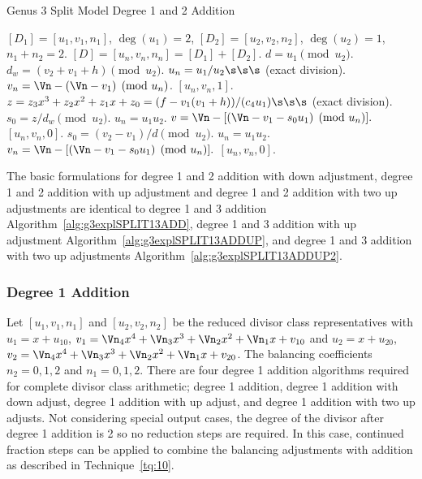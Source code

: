 \begin{algorithm}[H]
\caption{Genus 3 Split Model Degree 1 and 2 Addition\label{alg:g3explSPLIT12ADD}}
\begin{algorithmic} [1]
\Require $[D_1] = [u_1,v_1,n_1]$, $\deg(u_1) = 2$, $[D_2] = [u_2,v_2,n_2]$, $\deg(u_2) = 1$, $n_1 + n_2 = 2$.
\Ensure $[D] = [u_n,v_n,n_n] = [D_1] + [D_2] $.
\algrule
\vspace{-2pt}
\State $d = u_1 \pmod{u_2}$.
    \State $d_w = (v_2 + v_1 + h) \pmod{u_2}$.
        \State $u_n = u_1/u_2 \s\s\s$ (exact division).
        \State $v_n = \Vn - (\Vn - v_1) \pmod{u_n}$.
        \State \Return $[u_n,v_n,1]$.
    \EndIf
    \State $z = z_3x^3 + z_2x^2 + z_1x + z_0 = (f - v_1(v_1 + h))/(c_4u_1) \s\s\s$ (exact division).  
    \State $s_0 = z/d_w \pmod{u_2}$.
    \State $u_n = u_1u_2$.
    \State $v = \Vn - [(\Vn - v_1 - s_0u_1) \pmod{u_n}].$ 
    \State \Return $[u_n,v_n,0]$.
\EndIf
\State $s_0 = (v_2 - v_1)/d \pmod{u_2}$.
\State $u_n = u_1u_2$.
\State $v_n = \Vn - [(\Vn - v_1 - s_0u_1) \pmod{u_n}].$ 
\State \Return $[u_n,v_n,0]$.
\vspace{-2pt}
\end{algorithmic}
\end{algorithm}

The basic formulations for degree 1 and 2 addition with down adjustment, degree
1 and 2 addition with up adjustment and degree 1 and 2 addition with two up
adjustments are identical to degree 1 and 3 addition
Algorithm~\ref{alg:g3explSPLIT13ADD}, degree 1 and 3 addition with up adjustment
Algorithm~\ref{alg:g3explSPLIT13ADDUP}, and degree 1 and 3 addition with two up
adjustments Algorithm~\ref{alg:g3explSPLIT13ADDUP2}.


\subsubsection{Degree 1 Addition}
Let $[u_1,v_1,n_1]$ and $[u_2,v_2,n_2]$ be the reduced divisor class representatives
with $u_1 = x + u_{10}$, $v_1 = \Vn_4x^4 + \Vn_3x^3 + \Vn_2x^2 + \Vn_1x +
v_{10}$ and $u_2 = x + u_{20}$, $v_2 = \Vn_4x^4 + \Vn_3x^3 + \Vn_2x^2 + \Vn_1x +
v_{20}$. The balancing coefficients $n_2 = 0,1,2$ and $n_1 = 0,1,2$. There are
four degree 1 addition algorithms required for complete divisor class
arithmetic; degree 1 addition, degree 1 addition with down adjust, degree 1
addition with up adjust, and degree 1 addition with two up adjusts. Not
considering special output cases, the degree of the divisor after degree 1
addition is 2 so no reduction steps are required. In this case, continued
fraction steps can be applied to combine the balancing adjustments with addition
as described in Technique~\ref{tq:10}.

